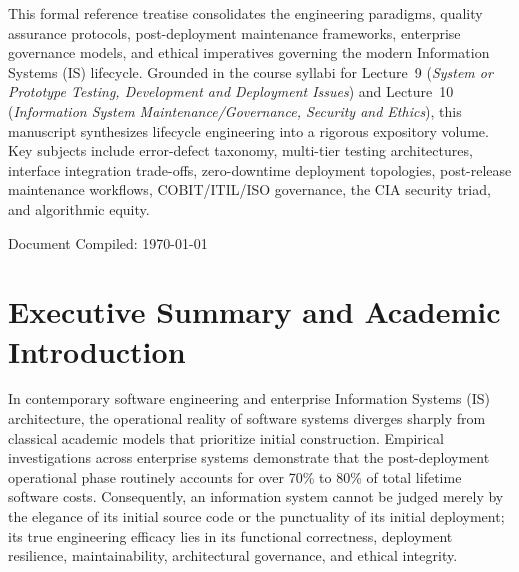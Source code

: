 \documentclass[11pt,a4paper]{article}
\begin{document}
\begin{titlepage}
    \vspace{2.5cm}
    
    \begin{tcolorbox}[colback=lightBg,colframe=primaryNavy,arc=4pt,boxrule=1pt,title={\bfseries Academic Abstract and Scope},fonttitle=\bfseries]
    This formal reference treatise consolidates the engineering paradigms, quality assurance protocols, post-deployment maintenance frameworks, enterprise governance models, and ethical imperatives governing the modern Information Systems (IS) lifecycle. Grounded in the course syllabi for Lecture~9 (\textit{System or Prototype Testing, Development and Deployment Issues}) and Lecture~10 (\textit{Information System Maintenance/Governance, Security and Ethics}), this manuscript synthesizes lifecycle engineering into a rigorous expository volume. Key subjects include error-defect taxonomy, multi-tier testing architectures, interface integration trade-offs, zero-downtime deployment topologies, post-release maintenance workflows, COBIT/ITIL/ISO governance, the CIA security triad, and algorithmic equity.
    \end{tcolorbox}
    
    \vfill
    {\small Document Compiled: \today\par}
\end{titlepage}

\tableofcontents
\newpage
{}
\hypersetup{pageanchor=true}

\section[Executive Summary]{Executive Summary and Academic Introduction}
\label{sec:intro}

In contemporary software engineering and enterprise Information Systems (IS) architecture, the operational reality of software systems diverges sharply from classical academic models that prioritize initial construction. Empirical investigations across enterprise systems demonstrate that the post-deployment operational phase routinely accounts for over 70\% to 80\% of total lifetime software costs. Consequently, an information system cannot be judged merely by the elegance of its initial source code or the punctuality of its initial deployment; its true engineering efficacy lies in its functional correctness, deployment resilience, maintainability, architectural governance, and ethical integrity.
\end{document}

